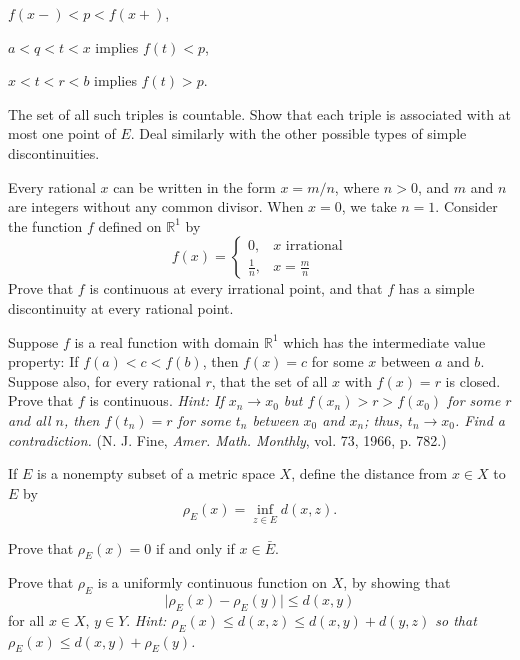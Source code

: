 \begin{exercise}
\begin{exercise}[label = (\alph*)]
  \item
    \(f(x-) < p < f(x+)\),
  \item
    \(a < q < t < x\) implies \(f(t) < p\),
  \item
    \(x < t < r < b\) implies \(f(t) > p\).
  \end{exercise}
  The set of all such triples is countable.
  Show that each triple is associated with at most one point of \(E\).
  Deal similarly with the other possible types of simple discontinuities.
\item
  Every rational \(x\) can be written in the form \(x = m/n\), where \(n > 0\),
  and \(m\) and \(n\) are integers without any common divisor.
  When \(x = 0\), we take \(n = 1\).
  Consider the function \(f\) defined on \(\mathbb{R}^1\) by
  \[
  f(x) =
  \begin{cases}
    0, & x\text{ irrational}\\
    \frac{1}{n}, & x = \frac{m}{n}
  \end{cases}
  \]
  Prove that \(f\) is continuous at every irrational point, and that \(f\) has
  a simple discontinuity at every rational point.
\item
  Suppose \(f\) is a real function with domain \(\mathbb{R}^1\) which has the
  intermediate value property: If \(f(a) < c < f(b)\), then \(f(x) = c\) for
  some \(x\) between \(a\) and \(b\).
  Suppose also, for every rational \(r\), that the set of all \(x\) with
  \(f(x) = r\) is closed.
  Prove that \(f\) is continuous.
  \textit{Hint: If \(x_n\to x_0\) but \(f(x_n) > r > f(x_0)\) for some \(r\)
    and all \(n\), then \(f(t_n) = r\) for some \(t_n\) between \(x_0\) and
    \(x_n\); thus, \(t_n\to x_0\).
    Find a contradiction.}
  (N. J. Fine, \textit{Amer. Math. Monthly}, vol. 73, 1966, p. 782.)
\item
  If \(E\) is a nonempty subset of a metric space \(X\), define the distance
  from \(x\in X\) to \(E\) by
  \[
  \rho_E(x) = \inf_{z\in E} d(x, z).
  \]
  \begin{exercise}[label = (\alph*)]
  \item
    Prove that \(\rho_E(x) = 0\) if and only if \(x\in\bar{E}\).
  \item
    Prove that \(\rho_E\) is a uniformly continuous function on \(X\), by
    showing that
    \[
    \lvert\rho_E(x) - \rho_E(y)\rvert\leq d(x, y)
    \]
    for all \(x\in X\), \(y\in Y\).
    \textit{Hint: \(\rho_E(x)\leq d(x,z)\leq d(x,y) + d(y,z)\) so that
      \(\rho_E(x)\leq d(x,y) + \rho_E(y)\).}
  \end{exercise}

\end{exercise}
